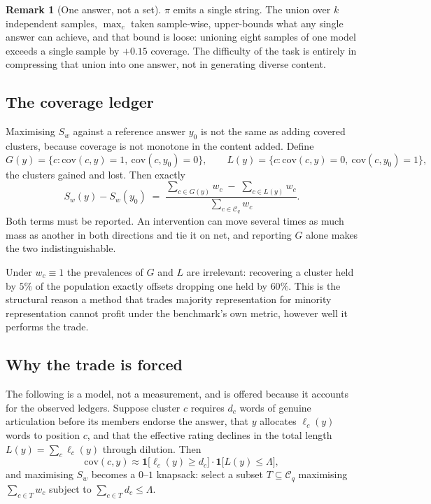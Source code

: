 \documentclass[11pt]{article}
\theoremstyle{definition}
\newtheorem{remark}{Remark}
\begin{document}
\begin{remark}[One answer, not a set]
$\pi$ emits a single string. The union over $k$ independent samples,
$\max_c$ taken sample-wise, upper-bounds what any single answer can achieve,
and that bound is loose: unioning eight samples of one model exceeds a single
sample by $+0.15$ coverage. The difficulty of the task is entirely in
compressing that union into one answer, not in generating diverse content.
\end{remark}

\subsection{The coverage ledger}

Maximising $S_w$ against a reference answer $y_0$ is not the same as adding
covered clusters, because coverage is not monotone in the content added. Define
\[
  G(y) = \{c : \mathrm{cov}(c,y) = 1,\ \mathrm{cov}(c,y_0) = 0\}, \qquad
  L(y) = \{c : \mathrm{cov}(c,y) = 0,\ \mathrm{cov}(c,y_0) = 1\},
\]
the clusters gained and lost. Then exactly
\[
  S_w(y) - S_w(y_0) \;=\;
  \frac{\sum_{c \in G(y)} w_c \;-\; \sum_{c \in L(y)} w_c}
       {\sum_{c \in \mathcal{C}_q} w_c}.
\]
Both terms must be reported. An intervention can move several times as much
mass as another in both directions and tie it on net, and reporting $G$ alone
makes the two indistinguishable.

Under $w_c \equiv 1$ the prevalences of $G$ and $L$ are irrelevant: recovering a
cluster held by $5\%$ of the population exactly offsets dropping one held by
$60\%$. This is the structural reason a method that trades majority
representation for minority representation cannot profit under the benchmark's
own metric, however well it performs the trade.

\subsection{Why the trade is forced}

The following is a model, not a measurement, and is offered because it accounts
for the observed ledgers. Suppose cluster $c$ requires $d_c$ words of genuine
articulation before its members endorse the answer, that $y$ allocates
$\ell_c(y)$ words to position $c$, and that the effective rating declines in the
total length $L(y) = \sum_c \ell_c(y)$ through dilution. Then
\[
  \mathrm{cov}(c, y) \approx \mathbf{1}\bigl[\ell_c(y) \ge d_c\bigr]
  \cdot \mathbf{1}\bigl[L(y) \le \Lambda\bigr],
\]
and maximising $S_w$ becomes a $0$--$1$ knapsack: select a subset
$T \subseteq \mathcal{C}_q$ maximising $\sum_{c \in T} w_c$ subject to
$\sum_{c \in T} d_c \le \Lambda$.
\end{document}

